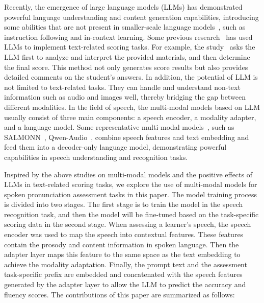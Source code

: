 Recently, the emergence of large language models (LLMs) \cite{gpt4,llama,qwen} has demonstrated powerful language understanding and content generation capabilities, introducing some abilities that are not present in smaller-scale language models~\cite{llm_survey}, such as instruction following and in-context learning. Some previous research~\cite{text_score1,text_score2,text_score3,text_score4} has used LLMs to implement text-related scoring tasks. For example, the study~\cite{text_score3} asks the LLM first to analyze and interpret the provided materials, and then determine the final score. This method not only generates score results but also provides detailed comments on the student’s answers. In addition, the potential of LLM is not limited to text-related tasks. They can handle and understand non-text information such as audio and images well, thereby bridging the gap between different modalities. In the field of speech, the multi-modal models based on LLM usually consist of three main components: a speech encoder, a modality adapter, and a language model. Some representative multi-modal models~\cite{salmonn,wavllm,salm,qwen_audio}, such as SALMONN~\cite{salmonn}, Qwen-Audio~\cite{qwen_audio}, combine speech features and text embedding and feed them into a decoder-only language model, demonstrating powerful capabilities in speech understanding and recognition tasks.

Inspired by the above studies on multi-modal models and the positive effects of LLMs in text-related scoring tasks, we explore the use of multi-modal models for spoken pronunciation assessment tasks in this paper. The model training process is divided into two stages. The first stage is to train the model in the speech recognition task, and then the model will be fine-tuned based on the task-specific scoring data in the second stage. When assessing a learner's speech, the speech encoder was used to map the speech into contextual features. These features contain the prosody and content information in spoken language. Then the adapter layer maps this feature to the same space as the text embedding to achieve the modality adaptation. Finally, the prompt text and the assessment task-specific prefix are embedded and concatenated with the speech features generated by the adapter layer to allow the LLM to predict the accuracy and fluency scores. The contributions of this paper are summarized as follows:


